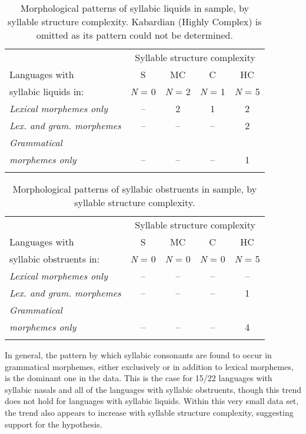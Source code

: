 \begin{table}
\begin{tabular}{lcccc}
\lsptoprule
 & \multicolumn{4}{c}{Syllable structure complexity}\\\cmidrule(lr){2-5}
Languages with & S & MC & C & HC\\
syllabic liquids in: & \textit{N} = 0 & \textit{N} = 2 & \textit{N} = 1 & \textit{N} = 5\\\midrule
 \textit{Lexical morphemes only} & -- & 2 & 1 & 2\\
 \textit{Lex. and gram. morphemes} & -- & -- & -- & 2\\
 \textit{Grammatical} \\
\textit{morphemes only} & -- & -- & -- & 1\\
\lspbottomrule
\end{tabular}
\caption{\label{tab:3.10}Morphological patterns of syllabic liquids in sample, by syllable structure complexity. Kabardian (Highly Complex) is omitted as its pattern could not be determined.}
\end{table}


\begin{table}
\begin{tabular}{lcccc}
\lsptoprule
 & \multicolumn{4}{c}{Syllable structure complexity}\\\cmidrule(lr){2-5}
Languages with & S & MC & C & HC\\
syllabic obstruents in: & \textit{N} = 0 & \textit{N} = 0 & \textit{N} = 0 & \textit{N} = 5\\\midrule
 \textit{Lexical morphemes only} & -- & -- & -- & --\\
 \textit{Lex. and gram. morphemes} & -- & -- & -- & 1\\
 \textit{Grammatical} \\
\textit{morphemes only} & -- & -- & -- & 4\\
\lspbottomrule
\end{tabular}
\caption{\label{tab:3.11}Morphological patterns of syllabic obstruents in sample, by syllable structure complexity.}
\end{table}

  In general, the pattern by which syllabic consonants are found to occur in grammatical morphemes, either exclusively or in addition to lexical morphemes, is the dominant one in the data. This is the case for 15/22 languages with syllabic nasals and all of the languages with syllabic obstruents, though this trend does not hold for languages with syllabic liquids. Within this very small data set, the trend also appears to increase with syllable structure complexity, suggesting support for the hypothesis. 

